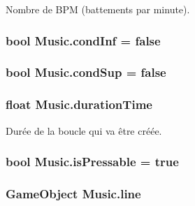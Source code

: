 Nombre de B\+P\+M (battements par minute). 

\hypertarget{class_music_a207d2cf72a65ec7a1e4ce02e3cfd29b9}{}
\subsubsection[{cond\+Inf}]{\setlength{\rightskip}{0pt plus 5cm}bool Music.\+cond\+Inf = false\hspace{0.3cm}{\ttfamily [private]}}\label{class_music_a207d2cf72a65ec7a1e4ce02e3cfd29b9}
\hypertarget{class_music_aeeb6f3c67f4b24bb83aaecf68075f51b}{}
\subsubsection[{cond\+Sup}]{\setlength{\rightskip}{0pt plus 5cm}bool Music.\+cond\+Sup = false\hspace{0.3cm}{\ttfamily [private]}}\label{class_music_aeeb6f3c67f4b24bb83aaecf68075f51b}
\hypertarget{class_music_ae4014f55d10343673bbf00004ebaaf31}{}
\subsubsection[{duration\+Time}]{\setlength{\rightskip}{0pt plus 5cm}float Music.\+duration\+Time\hspace{0.3cm}{\ttfamily [private]}}\label{class_music_ae4014f55d10343673bbf00004ebaaf31}


Durée de la boucle qui va être créée. 

\hypertarget{class_music_a6525acdf11a00376a98d5178ab822886}{}
\subsubsection[{is\+Pressable}]{\setlength{\rightskip}{0pt plus 5cm}bool Music.\+is\+Pressable = true\hspace{0.3cm}{\ttfamily [private]}}\label{class_music_a6525acdf11a00376a98d5178ab822886}
\hypertarget{class_music_a1507118c48dd86cf0cc02e35e9a878d2}{}
\subsubsection[{line}]{\setlength{\rightskip}{0pt plus 5cm}Game\+Object Music.\+line\hspace{0.3cm}{\ttfamily [private]}}\label{class_music_a1507118c48dd86cf0cc02e35e9a878d2}


